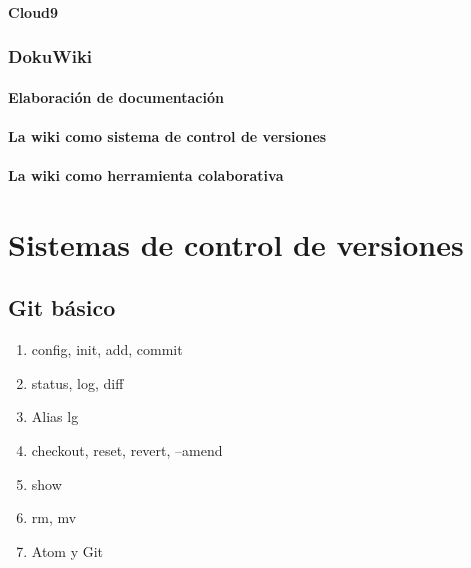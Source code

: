 \documentclass[a4paper,11pt,spanish]{sphinxmanual}
\begin{document}
\subsubsection{Cloud9}
\label{\detokenize{contenidos:id40}}

\subsection{DokuWiki}
\label{\detokenize{contenidos:id41}}

\subsubsection{Elaboración de documentación}
\label{\detokenize{contenidos:id42}}

\subsubsection{La wiki como sistema de control de versiones}
\label{\detokenize{contenidos:id43}}

\subsubsection{La wiki como herramienta colaborativa}
\label{\detokenize{contenidos:id44}}

\chapter{Sistemas de control de versiones}
\label{\detokenize{contenidos:id45}}

\section{Git básico}
\label{\detokenize{contenidos:id46}}\begin{enumerate}
\item {} 
config, init, add, commit

\item {} 
status, log, diff

\item {} 
Alias lg

\item {} 
checkout, reset, revert, --amend

\item {} 
show

\item {} 
rm, mv

\item {} 
Atom y Git

\end{enumerate}
\end{document}

